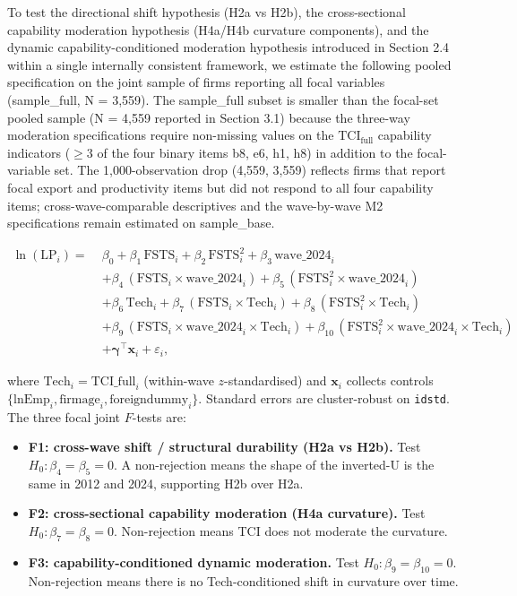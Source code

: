 \documentclass[12pt,a4paper]{article}
\providecommand{\tightlist}{\setlength{\itemsep}{0pt}\setlength{\parskip}{0pt}}
\begin{document}
To test the directional shift hypothesis (H2a vs H2b), the
cross-sectional capability moderation hypothesis (H4a/H4b curvature
components), and the dynamic capability-conditioned moderation
hypothesis introduced in Section 2.4 within a single internally
consistent framework, we estimate the following pooled specification on
the joint sample of firms reporting all focal variables (sample\_full, N
= 3,559). The sample\_full subset is smaller than the focal-set pooled
sample (N = 4,559 reported in Section 3.1) because the three-way
moderation specifications require non-missing values on the
\(\mathrm{TCI}_{\text{full}}\) capability indicators (\(\geq\)3 of the
four binary items b8, e6, h1, h8) in addition to the focal-variable set.
The 1,000-observation drop (4,559, 3,559) reflects firms that report
focal export and productivity items but did not respond to all four
capability items; cross-wave-comparable descriptives and the
wave-by-wave M2 specifications remain estimated on sample\_base.

\[
\begin{aligned}
\ln(\mathrm{LP}_i) =\;& \beta_0 + \beta_1\,\mathrm{FSTS}_i + \beta_2\,\mathrm{FSTS}_i^2 + \beta_3\,\mathrm{wave\_2024}_i \\
& + \beta_4\,(\mathrm{FSTS}_i \times \mathrm{wave\_2024}_i) + \beta_5\,(\mathrm{FSTS}_i^2 \times \mathrm{wave\_2024}_i) \\
& + \beta_6\,\mathrm{Tech}_i + \beta_7\,(\mathrm{FSTS}_i \times \mathrm{Tech}_i) + \beta_8\,(\mathrm{FSTS}_i^2 \times \mathrm{Tech}_i) \\
& + \beta_9\,(\mathrm{FSTS}_i \times \mathrm{wave\_2024}_i \times \mathrm{Tech}_i) + \beta_{10}\,(\mathrm{FSTS}_i^2 \times \mathrm{wave\_2024}_i \times \mathrm{Tech}_i) \\
& + \boldsymbol{\gamma}^{\top}\!\mathbf{x}_i + \varepsilon_i,
\end{aligned}
\]

where \(\mathrm{Tech}_i = \mathrm{TCI\_full}_i\) (within-wave
\(z\)-standardised) and \(\mathbf{x}_i\) collects controls
\(\{\mathrm{lnEmp}_i, \mathrm{firmage}_i, \mathrm{foreigndummy}_i\}\).
Standard errors are cluster-robust on \texttt{idstd}. The three focal
joint \(F\)-tests are:

\begin{itemize}
\tightlist
\item
  \textbf{F1: cross-wave shift / structural durability (H2a vs H2b).}
  Test \(H_0: \beta_4 = \beta_5 = 0\). A non-rejection means the shape
  of the inverted-U is the same in 2012 and 2024, supporting H2b over
  H2a.
\item
  \textbf{F2: cross-sectional capability moderation (H4a curvature).}
  Test \(H_0: \beta_7 = \beta_8 = 0\). Non-rejection means TCI does not
  moderate the curvature.
\item
  \textbf{F3: capability-conditioned dynamic moderation.} Test
  \(H_0: \beta_9 = \beta_{10} = 0\). Non-rejection means there is no
  Tech-conditioned shift in curvature over time.
\end{itemize}
\end{document}

